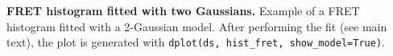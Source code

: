 \label{fig:histfit} \textbf{FRET histogram fitted with two Gaussians.}
Example of a FRET histogram fitted with a 2-Gaussian model.
After performing the fit (see main text), the plot is generated 
with \texttt{dplot(ds, hist\_fret, show\_model=True)}.
